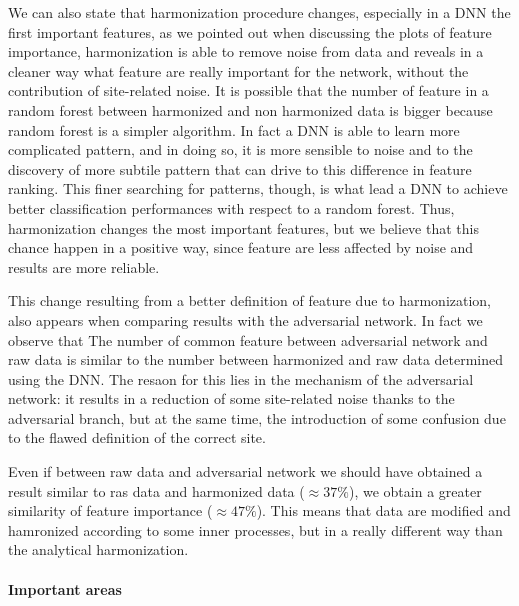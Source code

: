 \documentclass[11pt]{report}
\begin{document}
We can also state that harmonization procedure changes, especially in a DNN the first important features, as we pointed out when discussing the plots of feature importance, harmonization is able to remove noise from data and reveals in a cleaner way what feature are really important for the network, without the contribution of site-related noise.
It is possible that the number of feature in a random forest between harmonized and non harmonized data is bigger because random forest is a simpler algorithm.
In fact a DNN is able to learn more complicated pattern, and in doing so, it is more sensible to noise and to the discovery of more subtile pattern that can drive to this difference in feature ranking.
This finer searching for patterns, though, is what lead a DNN to achieve better classification performances with respect to a random forest.
Thus, harmonization changes the most important features, but we believe that this chance happen in a positive way, since feature are less affected by noise and results are more reliable.

This change resulting from a better definition of feature due to harmonization, also appears when comparing results with the adversarial network.
In fact we observe that
The number of common feature between adversarial network and raw data is similar to the number between harmonized and raw data determined using the DNN.
The resaon for this lies in the mechanism of the adversarial network: it results in a reduction of some site-related noise thanks to the adversarial branch, but at the same time, the introduction of some confusion due to the flawed definition of the correct site.

Even if between raw data and adversarial network we should have obtained a result similar to ras data and harmonized data ($\approx 37\%$), we obtain a greater similarity of feature importance ($\approx 47\%$).
This means that data are modified and hamronized according to some inner processes, but in a really different way than the analytical harmonization.

\paragraph{Important areas} \hfill

\newpage

\end{document}
